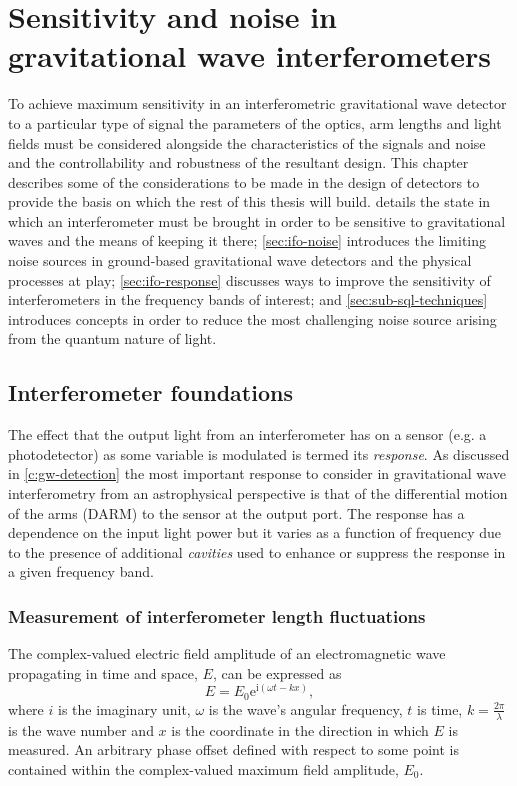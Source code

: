 \chapter{\label{c:instrumentation}Sensitivity and noise in gravitational wave interferometers}

To achieve maximum sensitivity in an interferometric gravitational wave detector to a particular type of signal the parameters of the optics, arm lengths and light fields must be considered alongside the characteristics of the signals and noise and the controllability and robustness of the resultant design. This chapter describes some of the considerations to be made in the design of detectors to provide the basis on which the rest of this thesis will build.  details the state in which an interferometer must be brought in order to be sensitive to gravitational waves and the means of keeping it there; \cref{sec:ifo-noise} introduces the limiting noise sources in ground-based gravitational wave detectors and the physical processes at play; \cref{sec:ifo-response} discusses ways to improve the sensitivity of interferometers in the frequency bands of interest; and \cref{sec:sub-sql-techniques} introduces concepts in order to reduce the most challenging noise source arising from the quantum nature of light.

\section{\label{sec:ifo-foundations}Interferometer foundations}
The effect that the output light from an interferometer has on a sensor (e.g. a photodetector) as some variable is modulated is termed its \emph{response}. As discussed in \cref{c:gw-detection} the most important response to consider in gravitational wave interferometry from an astrophysical perspective is that of the differential motion of the arms (\gls{DARM}) to the sensor at the output port. The response has a dependence on the input light power but it varies as a function of frequency due to the presence of additional \emph{cavities} used to enhance or suppress the response in a given frequency band.

\subsection{Measurement of interferometer length fluctuations}
The complex-valued electric field amplitude of an electromagnetic wave propagating in time and space, $E$, can be expressed as
\begin{equation}
  \label{eq:em-propagation}
  E = E_0 \text{e}^{\text{i} \left( \omega t - kx \right)},
\end{equation}
where $i$ is the imaginary unit, $\omega$ is the wave's angular frequency, $t$ is time, $k = \frac{2 \pi}{\lambda}$ is the wave number and $x$ is the coordinate in the direction in which $E$ is measured. An arbitrary phase offset defined with respect to some point is contained within the complex-valued maximum field amplitude, $E_0$.

